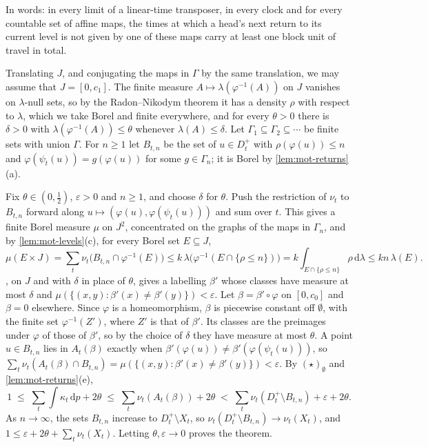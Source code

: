 In words: in every limit of a linear-time transposer, in every clock and for every countable set of affine maps, the
times at which a head's next return to its current level is not given by one of these maps carry at least one block
unit of travel in total.

\begin{informalproof}
Translating $J$, and conjugating the maps in $\Gamma$ by the same translation, we may assume that $J=[0,c_1]$. The
finite measure $A\mapsto\lambda(\varphi^{-1}(A))$ on $J$ vanishes on $\lambda$-null sets, so by the Radon--Nikodym
theorem it has a density $\rho$ with respect to $\lambda$, which we take Borel and finite everywhere, and for every
$\theta>0$ there is $\delta>0$ with $\lambda(\varphi^{-1}(A))\le\theta$ whenever $\lambda(A)\le\delta$. Let
$\Gamma_1\subseteq\Gamma_2\subseteq\cdots$ be finite sets with union $\Gamma$. For $n\ge1$ let $B_{t,n}$ be the set of
$u\in D^+_t$ with $\rho(\varphi(u))\le n$ and $\varphi(\psi_t(u))=g(\varphi(u))$ for some $g\in\Gamma_n$; it is Borel by
\cref{lem:mot-returns}(a).

Fix $\theta\in(0,\frac12)$, $\varepsilon>0$ and $n\ge1$, and choose $\delta$ for $\theta$. Push the restriction of
$\nu_t$ to $B_{t,n}$ forward along $u\mapsto(\varphi(u),\varphi(\psi_t(u)))$ and sum over $t$. This gives a finite Borel
measure $\mu$ on $J^2$, concentrated on the graphs of the maps in $\Gamma_n$, and by \cref{lem:mot-levels}(c), for
every Borel set $E\subseteq J$,
\[
  \mu(E\times J)=\sum_t\nu_t\bigl(B_{t,n}\cap\varphi^{-1}(E)\bigr)
  \le k\,\lambda\bigl(\varphi^{-1}(E\cap\{\rho\le n\})\bigr)=k\int_{E\cap\{\rho\le n\}}\rho\,\mathrm d\lambda
  \le kn\,\lambda(E).
\]
, on $J$ and with $\delta$ in place of $\theta$, gives a labelling $\beta'$ whose classes
have measure at most $\delta$ and $\mu(\{(x,y):\beta'(x)\ne\beta'(y)\})<\varepsilon$. Let $\beta=\beta'\circ\varphi$ on
$[0,c_0]$ and $\beta=0$ elsewhere. Since $\varphi$ is a homeomorphism, $\beta$ is piecewise constant off $\emptyset$,
with the finite set $\varphi^{-1}(Z')$, where $Z'$ is that of $\beta'$. Its classes are the preimages under $\varphi$ of
those of $\beta'$, so by the choice of $\delta$ they have measure at most $\theta$. A point $u\in B_{t,n}$ lies in $A_t(\beta)$ exactly when
$\beta'(\varphi(u))\ne\beta'(\varphi(\psi_t(u)))$, so
$\sum_t\nu_t(A_t(\beta)\cap B_{t,n})=\mu(\{(x,y):\beta'(x)\ne\beta'(y)\})<\varepsilon$. By $(\star)_\emptyset$ and
\cref{lem:mot-returns}(e),
\[
  1\;\le\;\sum_t\int\kappa_t\,\mathrm dp+2\theta\;\le\;\sum_t\nu_t(A_t(\beta))+2\theta
  \;<\;\sum_t\nu_t(D^+_t\setminus B_{t,n})+\varepsilon+2\theta .
\]
As $n\to\infty$, the sets $B_{t,n}$ increase to $D^+_t\setminus X_t$, so $\nu_t(D^+_t\setminus B_{t,n})\to\nu_t(X_t)$,
and $1\le\varepsilon+2\theta+\sum_t\nu_t(X_t)$. Letting $\theta,\varepsilon\to0$ proves the theorem.
\end{informalproof}

